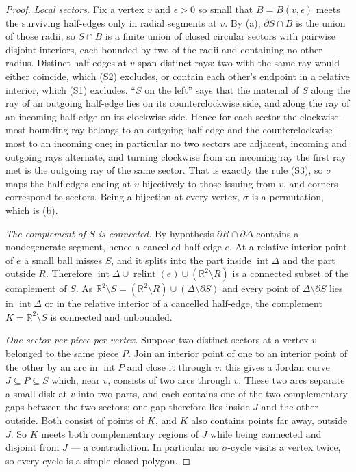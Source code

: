 \documentclass[11pt]{amsart}
\theoremstyle{definition}
\theoremstyle{remark}
\begin{document}
\begin{proof}
\emph{Local sectors.}  Fix a vertex $v$ and $\epsilon>0$ so small that
$B=B(v,\epsilon)$ meets the surviving half-edges only in radial segments at
$v$.  By (a), $\partial S\cap B$ is the union of those radii, so $S\cap B$ is
a finite union of closed circular sectors with pairwise disjoint interiors,
each bounded by two of the radii and containing no other radius.  Distinct
half-edges at $v$ span distinct rays: two with the same ray would either
coincide, which (S2) excludes, or contain each other's endpoint in a relative
interior, which (S1) excludes.  ``$S$ on the left'' says that the material of
$S$ along the ray of an outgoing half-edge lies on its counterclockwise side,
and along the ray of an incoming half-edge on its clockwise side.  Hence for
each sector the clockwise-most bounding ray belongs to an outgoing half-edge
and the counterclockwise-most to an incoming one; in particular no two
sectors are adjacent, incoming and outgoing rays alternate, and turning
clockwise from an incoming ray the first ray met is the outgoing ray of the
same sector.  That is exactly the rule (S3), so $\sigma$ maps the half-edges
ending at $v$ bijectively to those issuing from $v$, and corners correspond
to sectors.  Being a bijection at every vertex, $\sigma$ is a permutation,
which is (b).

\emph{The complement of $S$ is connected.}  By hypothesis
$\partial R\cap\partial\Delta$ contains a nondegenerate segment, hence a
cancelled half-edge $e$.  At a relative interior point of $e$ a small ball
misses $S$, and it splits into the part inside $\operatorname{int}\Delta$ and
the part outside $R$.  Therefore
$\operatorname{int}\Delta\cup\operatorname{relint}(e)\cup(\mathbb R^2\setminus
R)$ is a connected subset of the complement of $S$.  As
$\mathbb R^2\setminus S=(\mathbb R^2\setminus R)\cup(\Delta\setminus\partial
S)$ and every point of $\Delta\setminus\partial S$ lies in
$\operatorname{int}\Delta$ or in the relative interior of a cancelled
half-edge, the complement $K=\mathbb R^2\setminus S$ is connected and
unbounded.

\emph{One sector per piece per vertex.}  Suppose two distinct sectors at a
vertex $v$ belonged to the same piece $P$.  Join an interior point of one to
an interior point of the other by an arc in $\operatorname{int}P$ and close
it through $v$: this gives a Jordan curve $J\subseteq P\subseteq S$ which,
near $v$, consists of two arcs through $v$.  These two arcs separate a small
disk at $v$ into two parts, and each contains one of the two complementary
gaps between the two sectors; one gap therefore lies inside $J$ and the other
outside.  Both consist of points of $K$, and $K$ also contains points far
away, outside $J$.  So $K$ meets both complementary regions of $J$ while
being connected and disjoint from $J$ --- a contradiction.  In particular no
$\sigma$-cycle visits a vertex twice, so every cycle is a simple closed
polygon.


\end{proof}
\end{document}
